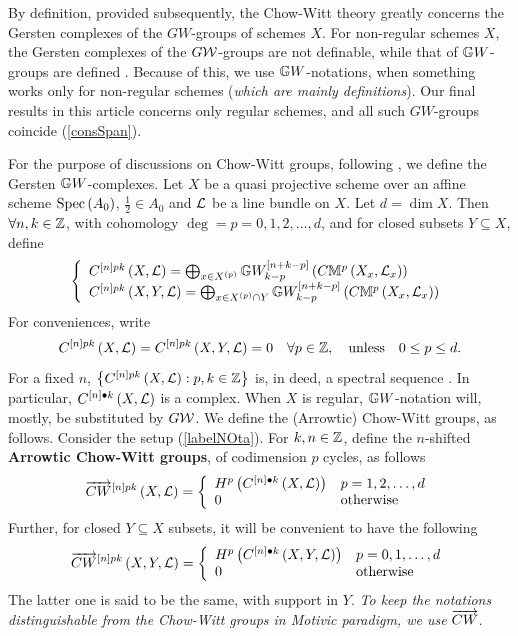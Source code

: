 \documentclass[12pt]{article}
\begin{document}
{\eE
By definition, provided subsequently, the Chow-Witt theory greatly concerns the Gersten complexes of the $GW$-groups of schemes $X$. For non-regular schemes $X$, the Gersten complexes of the $G{\CW}$-groups are not definable, while that of ${\BG}W$-groups are defined \cite[pp 474]{M23}. Because of this,
 we use  ${\BG}W$-notations,  when something works only for non-regular schemes ({\it which are mainly definitions}). 
Our final results in this article concerns only regular schemes, and all such $GW$-groups  coincide (\ref{consSpan}). 

}
\eN

For the purpose of discussions on Chow-Witt groups, following \cite[pp 474]{M23}, we define
the  Gersten ${\BG}W$-complexes.
%
\bD\label{notaSptrCx}{\rm 
Let  $X$ be a quasi projective scheme over an affine scheme $\spec{A_0}$, $\frac{1}{2}\in A_0$  and ${\CL}$ be a line bundle on $X$. Let $d=\dim X$. 
Then $\forall n, k \in {\BZ}$, with cohomology $\deg=p=0, 1, 2, \ldots, d$, %
and for closed subsets $Y \subseteq X$,
define
%
\begin{equation}\label{labelNOta}
\LBrace{{l}
C^{\LRt{n}pk}\LRf{X, {\CL}}= \bigoplus_{x\in X^{\LRf{p}}}{\BG}W_{k-p}^{\LRt{n+k-p}}\LRf{C{\BM}^{p}\LRf{X_x, {\CL}_x}} \\
C^{\LRt{n}pk}\LRf{X, Y, {\CL}}= \bigoplus_{x\in X^{\LRf{p}}\cap Y}{\BG}W_{k-p}^{\LRt{n+k-p}}\LRf{C{\BM}^{p}\LRf{X_x, {\CL}_x}} \\
}
\end{equation}
For conveniences, write 
$$
C^{\LRt{n}pk}\LRf{X, {\CL}}=C^{\LRt{n}pk}\LRf{X, Y, {\CL}}=0 \quad \forall p\in {\BZ}, \quad {\rm unless}\quad 0\leq p\leq d.
$$
%
For a fixed $n$, $\LRs{C^{\LRt{n}pk}\LRf{X, {\CL}}: p, k\in {\BZ}}$ is, in deed, a spectral sequence \cite[pp 478]{M23}. In particular,  $C^{\LRt{n}{\bul}k}\LRf{X, {\CL}}$ is a complex. When $X$ is regular, ${\BG}W$-notation will, mostly, be substituted by $G{\CW}$.
}
\eD
%
We define the (Arrowtic) Chow-Witt groups, as follows.
\bD\label{NotaArrCHWDef}{\rm 
Consider the setup (\ref{labelNOta}). For $k, n\in {\BZ}$, %
define
the  $n$-shifted {\bf Arrowtic Chow-Witt groups}, of codimension $p$ cycles, %
as follows
$$
\ora{CW}^{\LRt{n}pk}\LRf{X, {\CL}}=\LBrace{{ll}
 H^p\LRf{C^{\LRt{n}{\bul}k}\LRf{X, {\CL}}}  & p=1, 2, \ldots, d\\
%
0 & {\rm otherwise} \\
}
$$
Further, for closed $Y \subseteq X$ subsets, it will be convenient to have the following
$$
\ora{CW}^{\LRt{n}pk}\LRf{X, Y, {\CL}}=
\LBrace{{ll}
 H^p\LRf{C^{\LRt{n}{\bul}k}\LRf{X, Y, {\CL}}} & p=0, 1, \ldots, d \\
%
0 & {\rm otherwise} \\
} 
$$
The latter one is said to be the same, with support in $Y$. 
{\it To keep the notations distinguishable from the Chow-Witt groups in Motivic paradigm, we use} $\ora{CW}$. 
}
\end{document}
